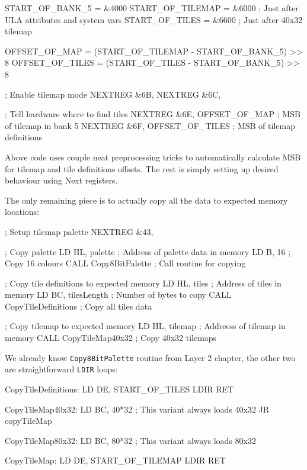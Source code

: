 \begin{tcblisting}{}
START_OF_BANK_5     = &4000
START_OF_TILEMAP    = &6000     ; Just after ULA attributes and system vars
START_OF_TILES      = &6600     ; Just after 40x32 tilemap

OFFSET_OF_MAP       = (START_OF_TILEMAP - START_OF_BANK_5) >> 8
OFFSET_OF_TILES     = (START_OF_TILES - START_OF_BANK_5) >> 8

    ; Enable tilemap mode
    NEXTREG &6B, %
    NEXTREG &6C, %

    ; Tell hardware where to find tiles
    NEXTREG &6E, OFFSET_OF_MAP   ; MSB of tilemap in bank 5
    NEXTREG &6F, OFFSET_OF_TILES ; MSB of tilemap definitions
\end{tcblisting}

Above code uses couple neat preprocessing tricks to automatically calculate MSB for tilemap and tile definitions offsets. The rest is simply setting up desired behaviour using Next registers.

\pagebreak
The only remaining piece is to actually copy all the data to expected memory locations:

\begin{tcblisting}{}
    ; Setup tilemap palette
    NEXTREG &43, %

    ; Copy palette
    LD HL, palette               ; Address of palette data in memory
    LD B, 16                     ; Copy 16 colours
    CALL Copy8BitPalette         ; Call routine for copying

    ; Copy tile definitions to expected memory
    LD HL, tiles                 ; Address of tiles in memory
    LD BC, tilesLength           ; Number of bytes to copy
    CALL CopyTileDefinitions     ; Copy all tiles data

    ; Copy tilemap to expected memory
    LD HL, tilemap               ; Addreess of tilemap in memory
    CALL CopyTileMap40x32        ; Copy 40x32 tilemaps
\end{tcblisting}

We already know {\tt Copy8BitPalette} routine from Layer 2 chapter, the other two are straightforward {\tt LDIR} loops:

\begin{tcblisting}{}
CopyTileDefinitions:
    LD DE, START_OF_TILES
    LDIR
    RET

CopyTileMap40x32:
    LD BC, 40*32        ; This variant always loads 40x32
    JR copyTileMap

CopyTileMap80x32:
    LD BC, 80*32        ; This variant always loads 80x32

CopyTileMap:
    LD DE, START_OF_TILEMAP
    LDIR
    RET
\end{tcblisting}

